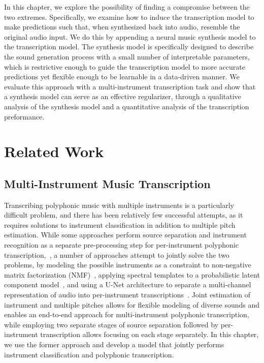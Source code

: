 In this chapter, we explore the possibility of finding a compromise between the two extremes.
Specifically, we examine how to induce the transcription model to make predictions such that, when synthesized back into audio, resemble the original audio input.
We do this by appending a neural music synthesis model to the transcription model.
The synthesis model is specifically designed to describe the sound generation process with a small number of interpretable parameters, which is restrictive enough to guide the transcription model to more accurate predictions yet flexible enough to be learnable in a data-driven manner.
We evaluate this approach with a multi-instrument transcription task and show that a synthesis model can serve as an effective regularizer, through a qualitative analysis of the synthesis model and a quantitative analysis of the transcription preformance.

\section{Related Work}


\subsection{Multi-Instrument Music Transcription}

Transcribing polyphonic music with multiple instruments is a particularly difficult problem, and there has been relatively few successful attempts, as it requires solutions to instrument classification in addition to multiple pitch estimation.
While some approaches perform source separation and instrument recognition as a separate pre-processing step for per-instrument polyphonic transcription,~\cite{heittola2009separation,itoyama2011bayesian}, a number of approaches attempt to jointly solve the two problems, by modeling the possible instruments as a constraint to non-negative matrix factorization (NMF)~\cite{grindlay2009eigeninstruments}, applying spectral templates to a probabilistic latent component model~\cite{benetos2015probabilistic}, and using a U-Net architecture to separate a multi-channel representation of audio into per-instrument transcriptions~\cite{wu2019musicnet}.
Joint estimation of instrument and multiple pitches allows for flexible modeling of diverse sounds and enables an end-to-end approach for multi-instrument polyphonic transcription, while employing two separate stages of source separation followed by per-instrument transcription allows focusing on each stage separately.
In this chapter, we use the former approach and develop a model that jointly performs instrument classification and polyphonic transcription.



